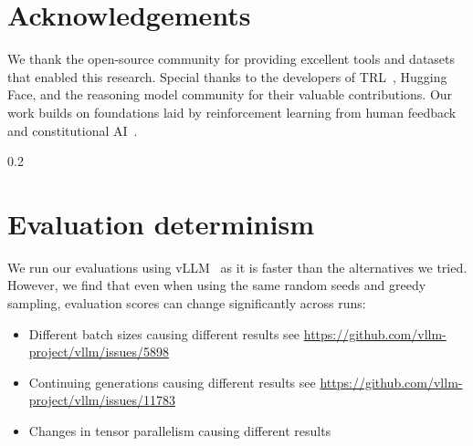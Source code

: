 \documentclass{article}
\theoremstyle{plain}
\theoremstyle{definition}
\theoremstyle{remark}
\begin{document}
\section*{Acknowledgements}

We thank the open-source community for providing excellent tools and datasets that enabled this research. Special thanks to the developers of TRL~\citep{vonwerra2022trl}, Hugging Face, and the reasoning model community for their valuable contributions. Our work builds on foundations laid by reinforcement learning from human feedback~\citep{ouyang2022training} and constitutional AI~\citep{bai2022constitutional}.




\newpage
\appendix
\onecolumn

\begin{spacing}{0.2}
\tableofcontents
\end{spacing}

\newpage


\FloatBarrier


\section{Evaluation determinism}
\label{sec:eval-determinism}

We run our evaluations using vLLM~\citep{kwon2023efficientmemorymanagementlarge} as it is faster than the alternatives we tried. However, we find that even when using the same random seeds and greedy sampling, evaluation scores can change significantly across runs:
\begin{itemize}
\item Different batch sizes causing different results see \url{https://github.com/vllm-project/vllm/issues/5898}
\item Continuing generations causing different results see \url{https://github.com/vllm-project/vllm/issues/11783}
\item Changes in tensor parallelism causing different results
\end{itemize}
\end{document}
